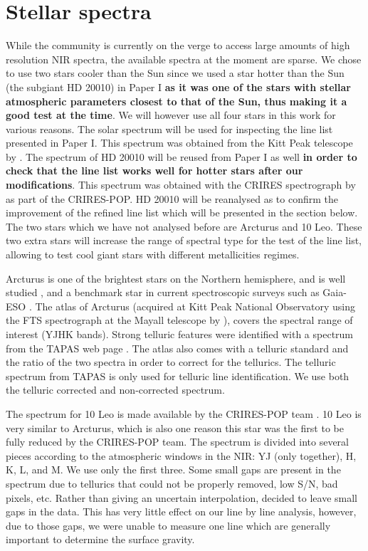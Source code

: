 \documentclass{aa}
\begin{document}
\section{Stellar spectra}
\label{sec:data}

While the community is currently on the verge to access large amounts of high resolution NIR
spectra, the available spectra at the moment are sparse. We chose to use two stars cooler than the
Sun since we used a star hotter than the Sun (the subgiant HD 20010) in Paper I {\bf as it was one
of the stars with stellar atmospheric parameters closest to that of the Sun, thus making it a good
test at the time}. We will however use all four stars in this work for various reasons. The solar
spectrum will be used for inspecting the line list presented in Paper I. This spectrum was obtained
from the Kitt Peak telescope by \citet{Hinkle1995}. The spectrum of HD 20010 will be reused from
Paper I as well {\bf in order to check that the line list works well for hotter stars after our
modifications}. This spectrum was obtained with the CRIRES spectrograph by \citet{Lebzelter2012} as
part of the CRIRES-POP. HD 20010 will be reanalysed as to confirm the improvement of the refined
line list which will be presented in the section below. The two stars which we have not analysed
before are Arcturus and 10 Leo. These two extra stars will increase the range of spectral type for
the test of the line list, allowing to test cool giant stars with different metallicities regimes.


Arcturus is one of the brightest stars on the Northern hemisphere, and is well
studied \citep[see e.g.][to mention just a
few]{Griffin1967,McWilliam1990,Ramirez2013}, and a benchmark star in
current spectroscopic surveys such as Gaia-ESO \citep{Jofre2014,Smiljanic2014}.
The atlas of Arcturus (acquired at Kitt Peak National Observatory using the FTS
spectrograph at the Mayall telescope by \citet{Hinkle1995a}), covers the
spectral range of interest (YJHK bands). Strong telluric features were
identified with a spectrum from the TAPAS web page \citep{Bertaux2014}. The
atlas also comes with a telluric standard and the ratio of the two spectra in
order to correct for the tellurics. The telluric spectrum from TAPAS is only
used for telluric line identification. We use both the telluric corrected and
non-corrected spectrum.

The spectrum for 10 Leo is made available by the CRIRES-POP team
\citep{Nicholls2017}. 10 Leo is very similar to Arcturus, which is also one
reason this star was the first to be fully reduced by the CRIRES-POP team. The
spectrum is divided into several pieces according to the atmospheric windows in
the NIR: YJ (only together), H, K, L, and M. We use only the first three. Some
small gaps are present in the spectrum due to tellurics that could not be
properly removed, low S/N, bad pixels, etc. Rather than giving an uncertain
interpolation, \citet{Nicholls2017} decided to leave small gaps in the data.
This has very little effect on our line by line analysis, however, due to those
gaps, we were unable to measure one  line which are generally
important to determine the surface gravity.
\end{document}
